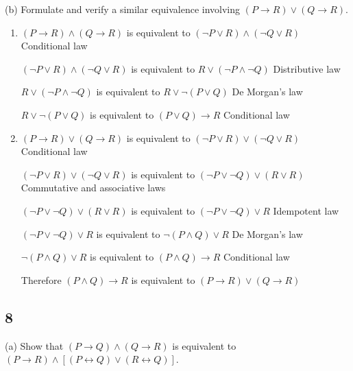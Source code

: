\documentclass{article}
\begin{document}
(b) Formulate and verify a similar equivalence involving $(P \rightarrow R) \lor (Q
\rightarrow R)$.
\begin{enumerate} [label=(\alph*)]
    \item 
    $(P \rightarrow R) \land (Q \rightarrow R)$ is equivalent to $(\neg P \lor R ) \land ( \neg Q \lor R)$ Conditional law
    
    $(\neg P \lor R ) \land ( \neg Q \lor R)$ is equivalent to $R \lor ( \neg P \land \neg Q)$ Distributive law
    
    $R \lor ( \neg P \land \neg Q)$ is equivalent to $R \lor \neg ( P \lor Q)$ De Morgan's law
    
    $R \lor \neg ( P \lor Q)$ is equivalent to $(P \lor Q) \rightarrow R$ Conditional law
    \item
    $(P \rightarrow R) \lor (Q\rightarrow R)$ is equivalent to $(\neg P \lor R)\lor(\neg Q \lor R)$ Conditional law
    
    $(\neg P \lor R)\lor(\neg Q \lor R)$ is equivalent to $(\neg P \lor \neg Q)\lor(R\lor R)$ Commutative and associative laws
    
    $(\neg P \lor \neg Q)\lor(R\lor R)$ is equivalent to $(\neg P \lor \neg Q)\lor R$ Idempotent law
    
    $(\neg P \lor \neg Q)\lor R$ is equivalent to $\neg (P \land Q) \lor R$ De Morgan's law
    
    $\neg (P \land Q) \lor R$ is equivalent to $(P\land Q) \rightarrow R$ Conditional law
    
    Therefore $(P\land Q) \rightarrow R$ is equivalent to $(P \rightarrow R) \lor (Q\rightarrow R)$
\end{enumerate}
\subsection{8}
(a) Show that $(P \rightarrow Q) \land (Q \rightarrow R)$ is equivalent to $(P \rightarrow R) \land [(P \leftrightarrow
Q)\lor (R \leftrightarrow Q)]$.
\end{document}
